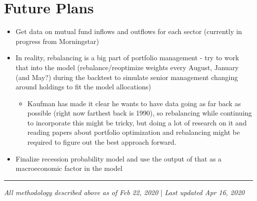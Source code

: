 \documentclass[]{article}
\providecommand{\tightlist}{%
  \setlength{\itemsep}{2pt}\setlength{\parskip}{0pt}}
\begin{document}
\hypertarget{future-plans}{%
\section{Future Plans}\label{future-plans}}

\begin{itemize}
\tightlist
\item
  Get data on mutual fund inflows and outflows for each sector
  (currently in progress from Morningstar)
\item
  In reality, rebalancing is a big part of portfolio management - try to work that into the model (rebalance/reoptimize weights every August, January (and May?) during the backtest to simulate senior management changing around holdings to fit the model allocations)
  \begin{itemize}
  	\item Kaufman has made it clear he wants to have data going as far back as possible (right now farthest back is 1990), so rebalancing while continuing to incorporate this might be tricky, but doing a lot of research on it and reading papers about portfolio optimization and rebalancing might be required to figure out the best approach forward.
  \end{itemize}
\item
  Finalize recession probability model and use the output of that as a macroeconomic factor in the model
\end{itemize}

\begin{center}
\noindent\rule{8cm}{0.4pt}

\emph{All methodology described above as of Feb 22, 2020} | \emph{Last updated Apr 16, 2020}
\end{center}
\end{document}
